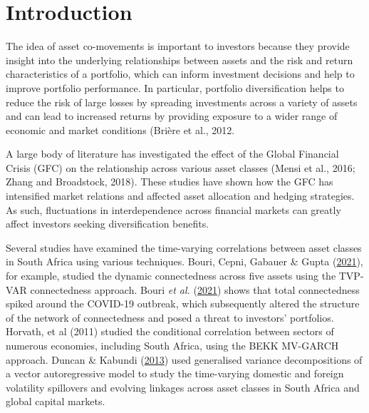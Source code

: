 \documentclass[11pt,preprint, authoryear]{elsarticle}
\numberwithin{equation}{section}
\numberwithin{figure}{section}
\numberwithin{table}{section}
\begin{document}
\pagestyle{fancy}
\chead{}
\rhead{}
\lfoot{}
\lhead{}
\cfoot{}


\headsep 35pt %




\hypertarget{introduction}{%
\section{\texorpdfstring{Introduction
\label{Introduction}}{Introduction }}\label{introduction}}

The idea of asset co-movements is important to investors because they
provide insight into the underlying relationships between assets and the
risk and return characteristics of a portfolio, which can inform
investment decisions and help to improve portfolio performance. In
particular, portfolio diversification helps to reduce the risk of large
losses by spreading investments across a variety of assets and can lead
to increased returns by providing exposure to a wider range of economic
and market conditions (Brière et al., 2012.

A large body of literature has investigated the effect of the Global
Financial Crisis (GFC) on the relationship across various asset classes
(Mensi et al., 2016; Zhang and Broadstock, 2018). These studies have
shown how the GFC has intensified market relations and affected asset
allocation and hedging strategies. As such, fluctuations in
interdependence across financial markets can greatly affect investors
seeking diversification benefits.

Several studies have examined the time-varying correlations between
asset classes in South Africa using various techniques. Bouri, Cepni,
Gabauer \& Gupta (\protect\hyperlink{ref-bouri2021return}{2021}), for
example, studied the dynamic connectedness across five assets using the
TVP-VAR connectedness approach. Bouri \emph{et al.}
(\protect\hyperlink{ref-bouri2021return}{2021}) shows that total
connectedness spiked around the COVID-19 outbreak, which subsequently
altered the structure of the network of connectedness and posed a threat
to investors' portfolios. Horvath, et al (2011) studied the conditional
correlation between sectors of numerous economies, including South
Africa, using the BEKK MV-GARCH approach. Duncan \& Kabundi
(\protect\hyperlink{ref-duncan2013domestic}{2013}) used generalised
variance decompositions of a vector autoregressive model to study the
time-varying domestic and foreign volatility spillovers and evolving
linkages across asset classes in South Africa and global capital
markets.
\end{document}
